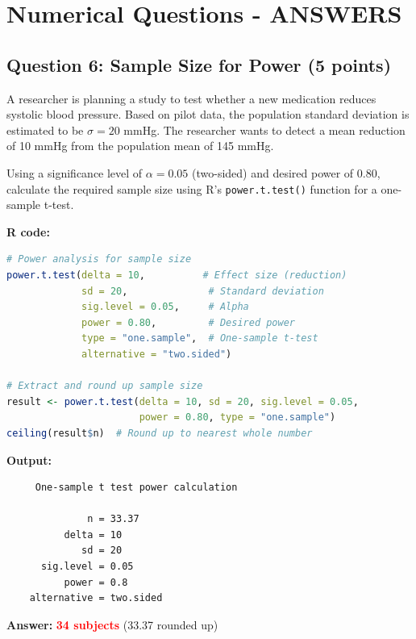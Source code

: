 \documentclass[11pt]{article}
\begin{document}
\newpage

\section{Numerical Questions - ANSWERS}

\subsection*{Question 6: Sample Size for Power (5 points)}

A researcher is planning a study to test whether a new medication reduces systolic blood pressure. Based on pilot data, the population standard deviation is estimated to be $\sigma = 20$ mmHg. The researcher wants to detect a mean reduction of 10 mmHg from the population mean of 145 mmHg.

\vspace{0.3cm}

Using a significance level of $\alpha = 0.05$ (two-sided) and desired power of 0.80, calculate the required sample size using R's \texttt{power.t.test()} function for a one-sample t-test.

\vspace{0.3cm}

\textbf{R code:}

\begin{lstlisting}[language=R,basicstyle=\small\ttfamily,frame=single]
# Power analysis for sample size
power.t.test(delta = 10,          # Effect size (reduction)
             sd = 20,              # Standard deviation
             sig.level = 0.05,     # Alpha
             power = 0.80,         # Desired power
             type = "one.sample",  # One-sample t-test
             alternative = "two.sided")

# Extract and round up sample size
result <- power.t.test(delta = 10, sd = 20, sig.level = 0.05,
                       power = 0.80, type = "one.sample")
ceiling(result$n)  # Round up to nearest whole number
\end{lstlisting}

\textbf{Output:}
\begin{verbatim}
     One-sample t test power calculation

              n = 33.37
          delta = 10
             sd = 20
      sig.level = 0.05
          power = 0.8
    alternative = two.sided
\end{verbatim}

\textbf{Answer:} \textcolor{red}{\textbf{34 subjects}} (33.37 rounded up)
\end{document}
